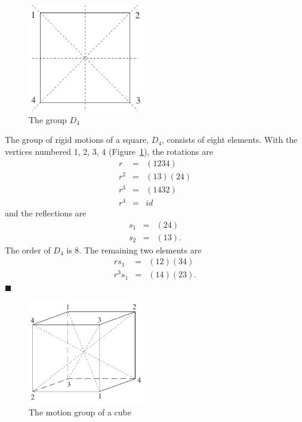  
\begin{figure}[hbt]
\begin{center}
\centerline {
\includegraphics[width=2in]{D4}
}
\end{center}
\caption{The group $D_4$}
\label{D4}
\end{figure}
 
 
\vspace{2ex}
 
 
The group of rigid motions of a square, $D_4$, consists of eight
elements. With the vertices numbered 1, 2, 3, 4 (Figure~\ref{D4}), the 
rotations are 
\begin{eqnarray*}
r & = & (1234) \\
r^2 & = & (13)(24) \\
r^3 & = & (1432) \\
r^4 & = & id
\end{eqnarray*}
and the reflections are
\begin{eqnarray*}
s_1 & = & (24) \\
s_2 & = & (13).
\end{eqnarray*}
The order of $D_4$ is 8. The remaining two elements are
\begin{eqnarray*}
r s_1 & = & (12)(34) \\
r^3 s_1 & = & (14)(23).
\end{eqnarray*}
\hspace{\fill} $\blacksquare$
 
 
 
\begin{figure}[hbt]
\begin{center}
\centerline {
\includegraphics[width=2in]{motions}
}
\end{center}
\caption{The motion group of a cube}
\label{motions}
\end{figure}
 
